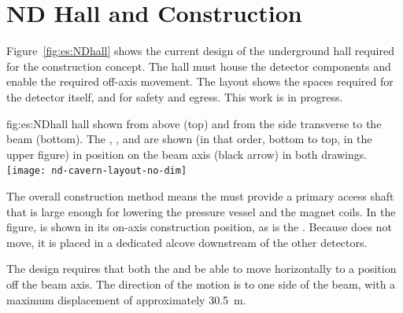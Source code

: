 \section{ND Hall and Construction}
\label{sec:exsum-nd-hall}
%

Figure~\ref{fig:es:NDhall} shows the current design of the underground hall required for the   construction concept. The hall must house the detector components and enable the required off-axis movement. The layout shows the spaces required for the detector itself, and for safety and egress.  This  work is in progress. 


\begin{dunefigure}{fig:es:NDhall}
{   hall shown from above (top) and from the side transverse to the beam (bottom). The , , and   are shown (in that order, bottom to top, in the upper figure) in position on the beam axis (black arrow) in both drawings. }
\texttt{[image: nd-cavern-layout-no-dim]}
\end{dunefigure}

The overall construction method means the  must %
provide a primary access shaft that is large enough for lowering the pressure vessel and the magnet coils. In the figure,  is shown in its on-axis construction position, %
as is the . %
Because   does not  move, it is placed in a dedicated alcove downstream of the other  detectors.

The  design requires that both the  and  be able to  move horizontally to a position off the beam axis. The direction of the motion is to one side of the beam, with a maximum displacement of approximately \SI{30.5}{m}. 